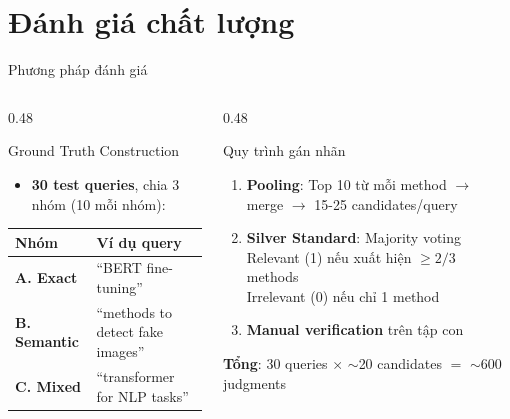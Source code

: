 \section{Đánh giá chất lượng}

\begin{frame}{Phương pháp đánh giá}
\begin{columns}[T]
\begin{column}{0.48\textwidth}

\begin{block}{Ground Truth Construction}
{\small
\begin{itemize}
    \item \textbf{30 test queries}, chia 3 nhóm (10 mỗi nhóm):
\end{itemize}
}

\vspace{0.05cm}

{\scriptsize
\begin{tabular}{l l}
\toprule
\textbf{Nhóm} & \textbf{Ví dụ query} \\
\midrule
\textcolor{accentBlue}{\textbf{A. Exact}} & ``BERT fine-tuning'' \\
\textcolor{accentOrange}{\textbf{B. Semantic}} & ``methods to detect fake images'' \\
\textcolor{accentTeal}{\textbf{C. Mixed}} & ``transformer for NLP tasks'' \\
\bottomrule
\end{tabular}
}
\end{block}

\end{column}
\begin{column}{0.48\textwidth}

\begin{block}{Quy trình gán nhãn}
{\small
\begin{enumerate}
    \item \textbf{Pooling}: Top 10 từ mỗi method $\to$ merge $\to$ 15-25 candidates/query
    \item \textbf{Silver Standard}: Majority voting\\
    Relevant (1) nếu xuất hiện $\geq 2/3$ methods\\
    Irrelevant (0) nếu chỉ 1 method
    \item \textbf{Manual verification} trên tập con
\end{enumerate}
}
\end{block}

\vspace{0.1cm}

{\footnotesize \textbf{Tổng}: 30 queries $\times$ $\sim$20 candidates $=$ $\sim$600 judgments}

\end{column}
\end{columns}
\end{frame}

